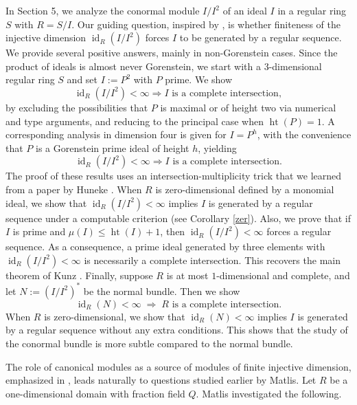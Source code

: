 \documentclass[10. pt,a4paper]{amsart}
\theoremstyle{definition}
\theoremstyle{remark}
\begin{document}
In Section 5, we analyze the conormal module \(I/I^2\) of an ideal \(I\) in a regular ring \(S\) with \(R = S/I\). Our guiding question, inspired by \cite{nano}, is whether finiteness of the injective dimension \(\operatorname{id}_R(I/I^2)\) forces \(I\) to be generated by a regular sequence. We provide several positive answers, mainly in non-Gorenstein cases. 
Since the product of ideals is almost never Gorenstein, we start with a \(3\)-dimensional regular ring \(S\) and set \(I := P^2\) with \(P\) prime. We show 
\[
\operatorname{id}_R(I/I^2) < \infty \Longrightarrow I \text{ is a complete intersection},
\]
by excluding the possibilities that \(P\) is maximal or of height two via numerical and type arguments, and reducing to the principal case when \(\operatorname{ht}(P)=1\). 
A corresponding analysis in dimension four is given for \(I = P^h\), with the convenience that \(P\) is a Gorenstein prime ideal of height \(h\), yielding
\[
\operatorname{id}_R(I/I^2) < \infty \Longrightarrow I \text{ is a complete intersection}.
\] 
The proof of these results uses an intersection-multiplicity trick that we learned from a paper by Huneke \cite{h}. 
When \(R\) is zero-dimensional defined by a monomial ideal, we show that \(\operatorname{id}_R(I/I^2) < \infty\) implies \(I\) is generated by a regular sequence under a computable criterion (see Corollary \ref{zer}).  
Also, we prove that if \(I\) is prime and \(\mu(I) \leq \operatorname{ht}(I)+1\), then \(\operatorname{id}_R(I/I^2) < \infty\) forces a regular sequence. As a consequence, a prime ideal generated by three elements with \(\operatorname{id}_R(I/I^2) < \infty\) is necessarily a complete intersection. This recovers the main theorem of Kunz \cite{kunz}.  
Finally, suppose \(R\) is at most \(1\)-dimensional and complete, and let \(N := (I/I^2)^*\) be the normal bundle. Then we show
\[
\operatorname{id}_R(N) < \infty \;\Longrightarrow\; R \text{ is a complete intersection}.
\]
When \(R\) is zero-dimensional, we show that \(\operatorname{id}_R(N) < \infty\) implies \(I\) is generated by a regular sequence without any extra conditions. This shows that the study of the conormal bundle is more subtle compared to the normal bundle.
	



The role of canonical modules as a source of modules of finite injective dimension, emphasized in \cite[2.38]{v1}, leads naturally to questions studied earlier by Matlis. Let $R$ be a one-dimensional domain with fraction field $Q$. Matlis investigated the following.
\end{document}

